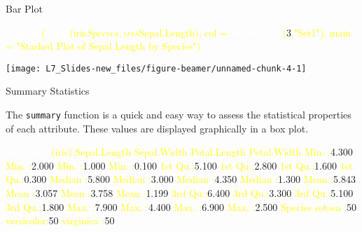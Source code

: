 \documentclass[ignorenonframetext,]{beamer}
\newenvironment{Shaded}{\begin{snugshade}}{\end{snugshade}}
\newcommand{\KeywordTok}[1]{\textcolor{white}{\textbf{{#1}}}}
\newcommand{\NormalTok}[1]{\textcolor{yellow}{{#1}}}
\newcommand{\DataTypeTok}[1]{\textcolor{yellow}{{#1}}}
\newcommand{\DecValTok}[1]{\textcolor{numbercolor}{{#1}}}
\newcommand{\FloatTok}[1]{\textcolor{numbercolor}{{#1}}}
\newcommand{\StringTok}[1]{\textcolor{yellow}{{#1}}}
\begin{document}
\begin{frame}[fragile]{Bar Plot}

\small

\begin{Shaded}
\begin{Highlighting}[]
\KeywordTok{barplot}\NormalTok{(}\KeywordTok{table}\NormalTok{(iris$Species,iris$Sepal.Length), }
        \DataTypeTok{col  =} \KeywordTok{brewer.pal}\NormalTok{(}\DecValTok{3}\NormalTok{,}\StringTok{"Set1"}\NormalTok{), }
        \DataTypeTok{main =} \StringTok{"Stacked Plot of Sepal Length by Species"}\NormalTok{)}
\end{Highlighting}
\end{Shaded}

\begin{center}\texttt{[image: L7\_Slides-new\_files/figure-beamer/unnamed-chunk-4-1]} \end{center}

\end{frame}

\begin{frame}[fragile]{Summary Statistics}

The \texttt{summary} function is a quick and easy way to assess the
statistical properties of each attribute. These values are displayed
graphically in a box plot.

\small

\begin{Shaded}
\begin{Highlighting}[]
\KeywordTok{summary}\NormalTok{(iris)}
  \NormalTok{Sepal.Length    Sepal.Width     Petal.Length    Petal.Width   }
 \NormalTok{Min.   :}\FloatTok{4.300}   \NormalTok{Min.   :}\FloatTok{2.000}   \NormalTok{Min.   :}\FloatTok{1.000}   \NormalTok{Min.   :}\FloatTok{0.100}  
 \NormalTok{1st Qu.:}\FloatTok{5.100}   \NormalTok{1st Qu.:}\FloatTok{2.800}   \NormalTok{1st Qu.:}\FloatTok{1.600}   \NormalTok{1st Qu.:}\FloatTok{0.300}  
 \NormalTok{Median :}\FloatTok{5.800}   \NormalTok{Median :}\FloatTok{3.000}   \NormalTok{Median :}\FloatTok{4.350}   \NormalTok{Median :}\FloatTok{1.300}  
 \NormalTok{Mean   :}\FloatTok{5.843}   \NormalTok{Mean   :}\FloatTok{3.057}   \NormalTok{Mean   :}\FloatTok{3.758}   \NormalTok{Mean   :}\FloatTok{1.199}  
 \NormalTok{3rd Qu.:}\FloatTok{6.400}   \NormalTok{3rd Qu.:}\FloatTok{3.300}   \NormalTok{3rd Qu.:}\FloatTok{5.100}   \NormalTok{3rd Qu.:}\FloatTok{1.800}  
 \NormalTok{Max.   :}\FloatTok{7.900}   \NormalTok{Max.   :}\FloatTok{4.400}   \NormalTok{Max.   :}\FloatTok{6.900}   \NormalTok{Max.   :}\FloatTok{2.500}  
       \NormalTok{Species  }
 \NormalTok{setosa    :}\DecValTok{50}  
 \NormalTok{versicolor:}\DecValTok{50}  
 \NormalTok{virginica :}\DecValTok{50}  
                
                
                
\end{Highlighting}
\end{Shaded}

\end{frame}
\end{document}
